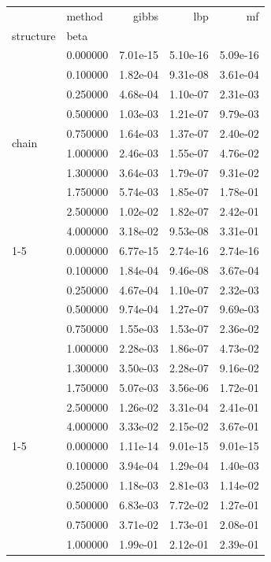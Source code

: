 \begin{tabular}{llrrr}
\toprule
 & method & gibbs & lbp & mf \\
structure & beta &  &  &  \\
\midrule
\multirow[t]{10}{*}{chain} & 0.000000 & 7.01e-15 & 5.10e-16 & 5.09e-16 \\
 & 0.100000 & 1.82e-04 & 9.31e-08 & 3.61e-04 \\
 & 0.250000 & 4.68e-04 & 1.10e-07 & 2.31e-03 \\
 & 0.500000 & 1.03e-03 & 1.21e-07 & 9.79e-03 \\
 & 0.750000 & 1.64e-03 & 1.37e-07 & 2.40e-02 \\
 & 1.000000 & 2.46e-03 & 1.55e-07 & 4.76e-02 \\
 & 1.300000 & 3.64e-03 & 1.79e-07 & 9.31e-02 \\
 & 1.750000 & 5.74e-03 & 1.85e-07 & 1.78e-01 \\
 & 2.500000 & 1.02e-02 & 1.82e-07 & 2.42e-01 \\
 & 4.000000 & 3.18e-02 & 9.53e-08 & 3.31e-01 \\
\cline{1-5}
\multirow[t]{10}{*}{cycle} & 0.000000 & 6.77e-15 & 2.74e-16 & 2.74e-16 \\
 & 0.100000 & 1.84e-04 & 9.46e-08 & 3.67e-04 \\
 & 0.250000 & 4.67e-04 & 1.10e-07 & 2.32e-03 \\
 & 0.500000 & 9.74e-04 & 1.27e-07 & 9.69e-03 \\
 & 0.750000 & 1.55e-03 & 1.53e-07 & 2.36e-02 \\
 & 1.000000 & 2.28e-03 & 1.86e-07 & 4.73e-02 \\
 & 1.300000 & 3.50e-03 & 2.28e-07 & 9.16e-02 \\
 & 1.750000 & 5.07e-03 & 3.56e-06 & 1.72e-01 \\
 & 2.500000 & 1.26e-02 & 3.31e-04 & 2.41e-01 \\
 & 4.000000 & 3.33e-02 & 2.15e-02 & 3.67e-01 \\
\cline{1-5}
\multirow[t]{10}{*}{dense} & 0.000000 & 1.11e-14 & 9.01e-15 & 9.01e-15 \\
 & 0.100000 & 3.94e-04 & 1.29e-04 & 1.40e-03 \\
 & 0.250000 & 1.18e-03 & 2.81e-03 & 1.14e-02 \\
 & 0.500000 & 6.83e-03 & 7.72e-02 & 1.27e-01 \\
 & 0.750000 & 3.71e-02 & 1.73e-01 & 2.08e-01 \\
 & 1.000000 & 1.99e-01 & 2.12e-01 & 2.39e-01 \\

\end{tabular}
